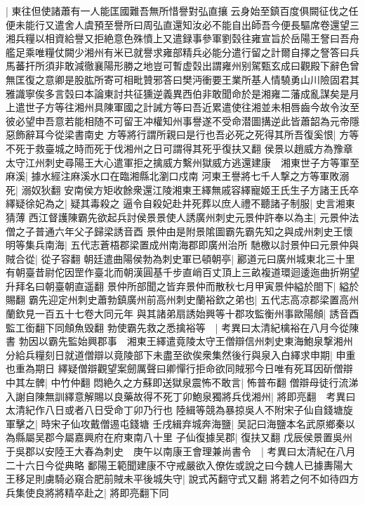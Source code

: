 |{
	東往但使諸蕭有一人能匡國難吾無所惜譽對弘直攘云身始至鎮百度俱闕征伐之任便未能行又遣舍人虞預至譽所曰周弘直還知汝必不能自出師吾今便長驅席卷還望三湘兵糧以相資給譽又拒絶意色殊憤上又遣録事參軍劉㲄往雍宣旨於岳陽王詧曰吾舟艦足乘唯糧仗闕少湘州有米已就譽求雍部精兵必能分遣行留之計爾自擇之詧答曰兵馬蕃扞所須非敢減徹襄陽形勝之地豈可暫虚㲄出謂雍州别駕甄玄成曰觀殿下辭色曾無匡復之意卿是股肱所寄可相毗贊邪答曰樊沔衝要王業所基人情驍勇山川險固君其雅識寧俟多言㲄曰本論東討共征獯逆義異西伯非敢聞命於是湘雍二藩成亂謀矣是月上遣世子方等往湘州具陳軍國之計誡方等曰吾近累遣使往湘並未相唇齒今故令汝至彼必望申吾意若能相随不可留王冲權知州事譽遂不受命潜圖搆逆此皆蕭韶為元帝隱惡飾辭耳今從梁書南史}
方等將行謂所親曰是行也吾必死之死得其所吾復奚恨|{
	方等不死于救臺城之時而死于伐湘州之日可謂得其死乎復扶又翻}
侯景以趙威方為豫章太守江州刺史尋陽王大心遣軍拒之擒威方繫州獄威方逃還建康　湘東世子方等軍至麻溪|{
	據水經注麻溪水口在臨湘縣北瀏口戍南}
河東王譽將七千人撃之方等軍敗溺死|{
	溺奴狄翻}
安南侯方矩收餘衆還江陵湘東王繹無戚容繹寵姬王氏生子方諸王氏卒繹疑徐妃為之|{
	疑其毒殺之}
逼令自殺妃赴井死葬以庶人禮不聽諸子制服|{
	史言湘東猜薄}
西江督護陳霸先欲起兵討侯景景使人誘廣州刺史元景仲許奉以為主|{
	元景仲法僧之子普通六年父子歸梁誘音酉}
景仲由是附景隂圖霸先霸先知之與成州刺史王懷明等集兵南海|{
	五代志蒼梧郡梁置成州南海郡即廣州治所}
馳檄以討景仲曰元景仲與賊合從|{
	從子容翻}
朝廷遣曲陽侯勃為刺史軍已頓朝亭|{
	酈道元曰廣州城東北三十里有朝臺昔尉佗因罡作臺北而朝漢圓基千步直峭百丈頂上三畝複道環迴逶迤曲折朔望升拜名曰朝臺朝直遥翻}
景仲所部聞之皆弃景仲而散秋七月甲寅景仲縊於閤下|{
	縊於賜翻}
霸先迎定州刺史蕭勃鎮廣州前高州刺史蘭裕欽之弟也|{
	五代志高凉郡梁置高州蘭欽見一百五十七卷大同元年}
與其諸弟扇誘始興等十郡攻監衡州事歐陽頠|{
	誘音酉監工銜翻下同頠魚毁翻}
勃使霸先救之悉擒裕等　|{
	考異曰太清紀檎裕在八月今從陳書}
勃因以霸先監始興郡事　湘東王繹遣竟陵太守王僧辯信州刺史東海鮑泉撃湘州分給兵糧刻日就道僧辯以竟陵部下未盡至欲俟衆集然後行與泉入白繹求申期|{
	申重也重為期日}
繹疑僧辯觀望案劒厲聲曰卿憚行拒命欲同賊邪今日唯有死耳因斫僧辯中其左髀|{
	中竹仲翻}
悶絶久之方蘇即送獄泉震怖不敢言|{
	怖普布翻}
僧辯母徒行流涕入謝自陳無訓繹意解賜以良藥故得不死丁卯鮑泉獨將兵伐湘州|{
	將即亮翻　考異曰太清紀作八日或者八日受命丁卯乃行也}
陸緝等競為暴掠吳人不附宋子仙自錢塘旋軍擊之|{
	時宋子仙攻戴僧逷屯錢塘}
壬戌緝弃城奔海鹽|{
	吴記曰海鹽本名武原鄉秦以為縣屬吴郡今屬嘉興府在府東南八十里}
子仙復據吴郡|{
	復扶又翻}
戊辰侯景置吳州于吳郡以安陸王大春為刺史　庚午以南康王會理兼尚書令　|{
	考異曰太清紀在八月二十六日今從典略}
鄱陽王範聞建康不守戒嚴欲入僚佐或說之曰今魏人已據夀陽大王移足則虜騎必窺合肥前賊未平後城失守|{
	說式芮翻守式又翻}
將若之何不如待四方兵集使良將將精卒赴之|{
	將即亮翻下同}
